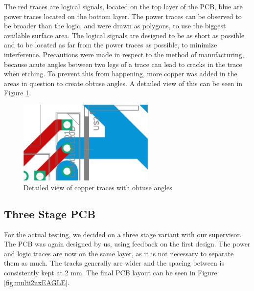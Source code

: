 The red traces are logical signals,
located on the top layer of the PCB,
blue are power traces located on the bottom layer.
The power traces can be observed to be broader than the logic,
and were drawn as polygons,
to use the biggest available surface area.
The logical signals are designed to be as short as possible
and to be located as far from the power traces as possible,
to minimize interference.
\clearpage
Precautions were made in respect to the method of manufacturing,
because acute angles between two legs of a trace can lead to cracks in the trace when etching.
To prevent this from happening,
more copper was added in the areas in question to create obtuse angles.
A detailed view of this can be seen in Figure \ref{fig:2nxeagledetail}.
\begin{figure}[H]
	\begin{center}
	\includegraphics[width=0.6\textwidth]{figures/05cPCBdesign/2NX_interleaved_boost_converter_EAGLE_BY_DANIEL_DETAIL.pdf}
	\end{center}
	\caption{Detailed view of copper traces with obtuse angles}
	\label{fig:2nxeagledetail}
\end{figure}

\subsection{Three Stage PCB}\label{sub:3sPCB}
For the actual testing,
we decided on a three stage variant with our supervisor.
The PCB was again designed by us,
using feedback on the first design.
The power and logic traces are now on the same layer,
as it is not necessary to separate them as much.
The tracks generally are wider
and the spacing between is consistently kept at 2 mm.
The final PCB layout can be seen in Figure \ref{fig:multi2nxEAGLE}.

